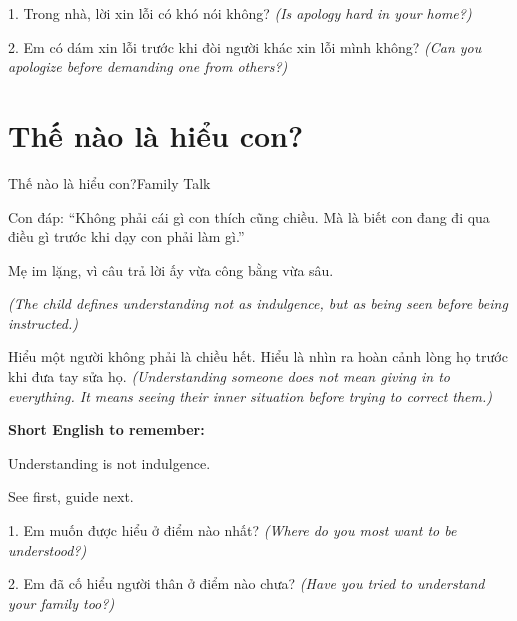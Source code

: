 \begin{tuhocnhanh}
1. Trong nhà, lời xin lỗi có khó nói không? \textit{(Is apology hard in your home?)}

2. Em có dám xin lỗi trước khi đòi người khác xin lỗi mình không? \textit{(Can you apologize before demanding one from others?)}
\end{tuhocnhanh}
\ngancach

\section{Thế nào là hiểu con?}
\begin{truyen}{Thế nào là hiểu con?}{Family Talk}

Con đáp: ``Không phải cái gì con thích cũng chiều. Mà là biết con đang đi qua điều gì trước khi dạy con phải làm gì.''

Mẹ im lặng, vì câu trả lời ấy vừa công bằng vừa sâu.

\textit{(The child defines understanding not as indulgence, but as being seen before being instructed.)}
\end{truyen}

\begin{baihoc}
Hiểu một người không phải là chiều hết. Hiểu là nhìn ra hoàn cảnh lòng họ trước khi đưa tay sửa họ.
\textit{(Understanding someone does not mean giving in to everything. It means seeing their inner situation before trying to correct them.)}
\end{baihoc}

\begin{ghinhoanh}
\textbf{Short English to remember:}

Understanding is not indulgence.

See first, guide next.
\end{ghinhoanh}

\begin{tuhocnhanh}
1. Em muốn được hiểu ở điểm nào nhất? \textit{(Where do you most want to be understood?)}

2. Em đã cố hiểu người thân ở điểm nào chưa? \textit{(Have you tried to understand your family too?)}
\end{tuhocnhanh}
\ngancach